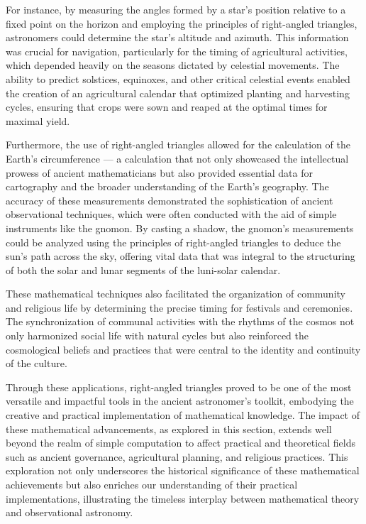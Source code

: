 \documentclass[10pt]{article}
\begin{document}
\vspace{15pt}

\vspace{7pt}

For instance, by measuring the angles formed by a star's position relative to a fixed point on the horizon and employing the principles of right-angled triangles, astronomers could determine the star's altitude and azimuth. This information was crucial for navigation, particularly for the timing of agricultural activities, which depended heavily on the seasons dictated by celestial movements. The ability to predict solstices, equinoxes, and other critical celestial events enabled the creation of an agricultural calendar that optimized planting and harvesting cycles, ensuring that crops were sown and reaped at the optimal times for maximal yield.

\vspace{7pt}

Furthermore, the use of right-angled triangles allowed for the calculation of the Earth's circumference — a calculation that not only showcased the intellectual prowess of ancient mathematicians but also provided essential data for cartography and the broader understanding of the Earth's geography. The accuracy of these measurements demonstrated the sophistication of ancient observational techniques, which were often conducted with the aid of simple instruments like the gnomon. By casting a shadow, the gnomon's measurements could be analyzed using the principles of right-angled triangles to deduce the sun's path across the sky, offering vital data that was integral to the structuring of both the solar and lunar segments of the luni-solar calendar.

\vspace{7pt}

These mathematical techniques also facilitated the organization of community and religious life by determining the precise timing for festivals and ceremonies. The synchronization of communal activities with the rhythms of the cosmos not only harmonized social life with natural cycles but also reinforced the cosmological beliefs and practices that were central to the identity and continuity of the culture.

\vspace{7pt}

Through these applications, right-angled triangles proved to be one of the most versatile and impactful tools in the ancient astronomer's toolkit, embodying the creative and practical implementation of mathematical knowledge. The impact of these mathematical advancements, as explored in this section, extends well beyond the realm of simple computation to affect practical and theoretical fields such as ancient governance, agricultural planning, and religious practices. This exploration not only underscores the historical significance of these mathematical achievements but also enriches our understanding of their practical implementations, illustrating the timeless interplay between mathematical theory and observational astronomy.
\end{document}
